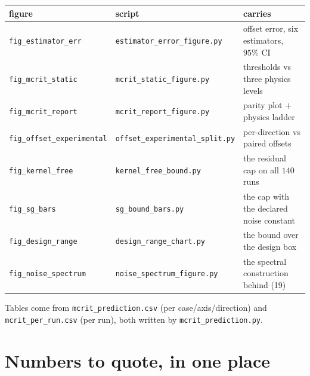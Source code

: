 \documentclass[10pt]{article}
\newcommand{\scr}[1]{\texttt{\small #1}}
\begin{document}
\begin{center}\small
\begin{tabular}{@{}lll@{}}
\toprule
figure & script & carries\\
\midrule
\scr{fig\_estimator\_err} & \scr{estimator\_error\_figure.py} &
  offset error, six estimators, $95\%$ CI\\
\scr{fig\_mcrit\_static} & \scr{mcrit\_static\_figure.py} &
  thresholds vs three physics levels\\
\scr{fig\_mcrit\_report} & \scr{mcrit\_report\_figure.py} &
  parity plot $+$ physics ladder\\
\scr{fig\_offset\_experimental} & \scr{offset\_experimental\_split.py} &
  per-direction vs paired offsets\\
\scr{fig\_kernel\_free} & \scr{kernel\_free\_bound.py} &
  the residual cap on all $140$ runs\\
\scr{fig\_sg\_bars} & \scr{sg\_bound\_bars.py} &
  the cap with the declared noise constant\\
\scr{fig\_design\_range} & \scr{design\_range\_chart.py} &
  the bound over the design box\\
\scr{fig\_noise\_spectrum} & \scr{noise\_spectrum\_figure.py} &
  the spectral construction behind (19)\\
\bottomrule
\end{tabular}
\end{center}

Tables come from \scr{mcrit\_prediction.csv} (per case/axis/direction)
and \scr{mcrit\_per\_run.csv} (per run), both written by
\scr{mcrit\_prediction.py}.

\section{Numbers to quote, in one place}
\end{document}
